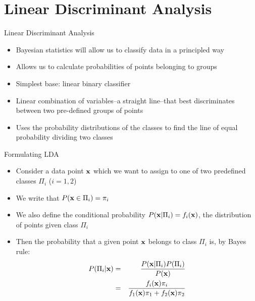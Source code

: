 \documentclass{beamer}
\begin{document}
\section{Linear Discriminant Analysis}

\begin{frame}{Linear Discriminant Analysis}
  \begin{itemize}
    \item Bayesian statistics will allow us to classify data in a principled way
    \item Allows us to calculate probabilities of points belonging to groups
    \item Simplest base: linear binary classifier
    \item Linear combination of variables--a straight line--that best discriminates between two pre-defined groups of points
    \item Uses the probability distributions of the classes to find the line of equal probability dividing two classes
  \end{itemize}
\end{frame}

\begin{frame}{Formulating LDA}
  \begin{itemize}
    \item Consider a data point $\mathbf{x}$ which we want to assign to one of two predefined classes $\Pi_i$ ($i=1,2$)
    \item We write that $P(\mathbf{x}\in\Pi_i) = \pi_i$
    \item We also define the conditional probability $P(\mathbf{x}|\Pi_i)=f_i(\mathbf{x})$, the distribution of points given class $\Pi_i$
    \item Then the probability that a given point $\mathbf{x}$ belongs to class $\Pi_i$ is, by Bayes rule:
      \begin{eqnarray*}
        P(\Pi_i|\mathbf{x})  &=& \frac{P(\mathbf{x}|\Pi_i)P(\Pi_i)}{P(\mathbf{x})}\\
        &=& \frac{f_i(\mathbf{x})\pi_i}{f_1(\mathbf{x})\pi_1+f_2(\mathbf{x})\pi_2}
      \end{eqnarray*}
  \end{itemize}      
\end{frame}
\end{document}
